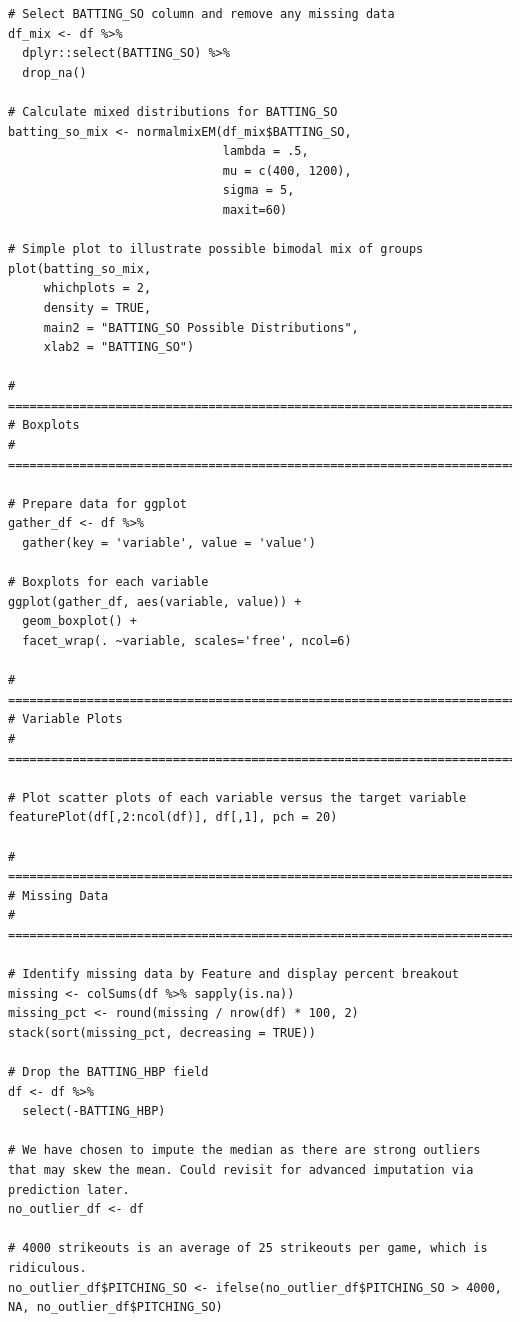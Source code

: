 \documentclass[
]{article}
\begin{document}
\begin{verbatim}
# Select BATTING_SO column and remove any missing data
df_mix <- df %>% 
  dplyr::select(BATTING_SO) %>%
  drop_na()

# Calculate mixed distributions for BATTING_SO
batting_so_mix <- normalmixEM(df_mix$BATTING_SO, 
                              lambda = .5, 
                              mu = c(400, 1200), 
                              sigma = 5, 
                              maxit=60)

# Simple plot to illustrate possible bimodal mix of groups
plot(batting_so_mix, 
     whichplots = 2,
     density = TRUE, 
     main2 = "BATTING_SO Possible Distributions", 
     xlab2 = "BATTING_SO")
     
# =====================================================================================
# Boxplots 
# =====================================================================================

# Prepare data for ggplot
gather_df <- df %>% 
  gather(key = 'variable', value = 'value')

# Boxplots for each variable
ggplot(gather_df, aes(variable, value)) + 
  geom_boxplot() + 
  facet_wrap(. ~variable, scales='free', ncol=6)

# =====================================================================================
# Variable Plots
# =====================================================================================
  
# Plot scatter plots of each variable versus the target variable
featurePlot(df[,2:ncol(df)], df[,1], pch = 20)

# =====================================================================================
# Missing Data 
# =====================================================================================

# Identify missing data by Feature and display percent breakout
missing <- colSums(df %>% sapply(is.na))
missing_pct <- round(missing / nrow(df) * 100, 2)
stack(sort(missing_pct, decreasing = TRUE))

# Drop the BATTING_HBP field
df <- df %>% 
  select(-BATTING_HBP)

# We have chosen to impute the median as there are strong outliers that may skew the mean. Could revisit for advanced imputation via prediction later.
no_outlier_df <- df

# 4000 strikeouts is an average of 25 strikeouts per game, which is ridiculous.
no_outlier_df$PITCHING_SO <- ifelse(no_outlier_df$PITCHING_SO > 4000, NA, no_outlier_df$PITCHING_SO)


\end{verbatim}
\end{document}
